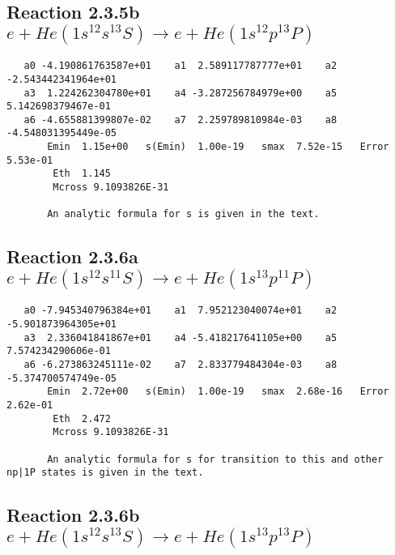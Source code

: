 \documentclass[12pt,dvipdfm]{article}
\begin{document}
\subsection{
Reaction 2.3.5b $   e + He(1s^12s^13S) \rightarrow e + He(1s^12p^13P)$}





\begin{small}\begin{verbatim}
   a0 -4.190861763587e+01    a1  2.589117787777e+01    a2 -2.543442341964e+01
   a3  1.224262304780e+01    a4 -3.287256784979e+00    a5  5.142698379467e-01
   a6 -4.655881399807e-02    a7  2.259789810984e-03    a8 -4.548031395449e-05
       Emin  1.15e+00   s(Emin)  1.00e-19   smax  7.52e-15   Error  5.53e-01
        Eth  1.145
        Mcross 9.1093826E-31

       An analytic formula for s is given in the text.
\end{verbatim}\end{small}




\newpage
\subsection{
Reaction 2.3.6a $   e + He(1s^12s^11S) \rightarrow e + He(1s^13p^11P)$}





\begin{small}\begin{verbatim}
   a0 -7.945340796384e+01    a1  7.952123040074e+01    a2 -5.901873964305e+01
   a3  2.336041841867e+01    a4 -5.418217641105e+00    a5  7.574234290606e-01
   a6 -6.273863245111e-02    a7  2.833779484304e-03    a8 -5.374700574749e-05
       Emin  2.72e+00   s(Emin)  1.00e-19   smax  2.68e-16   Error  2.62e-01
        Eth  2.472
        Mcross 9.1093826E-31

       An analytic formula for s for transition to this and other np|1P states is given in the text.
\end{verbatim}\end{small}




\newpage
\subsection{
Reaction 2.3.6b $  e + He(1s^12s^13S) \rightarrow e + He(1s^13p^13P)$}
\end{document}
